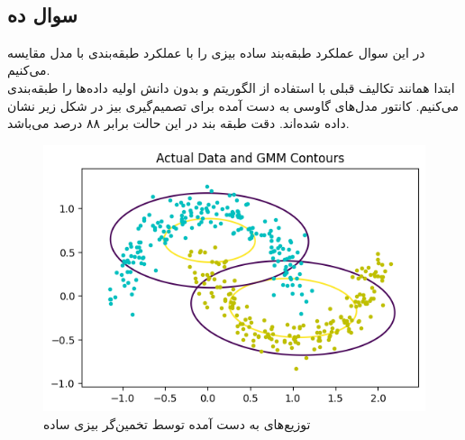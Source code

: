 \documentclass[12pt,onecolumn,a4paper]{article}
\begin{document}
\newpage
~\newpage
\subsection{سوال ده}
در این سوال عملکرد طبقه‌بند ساده بیزی را با عملکرد طبقه‌بندی با مدل  مقایسه می‌کنیم.
\\
ابتدا همانند تکالیف قبلی با استفاده از الگوریتم  و بدون دانش اولیه  داده‌ها را طبقه‌بندی می‌کنیم. کانتور مدل‌های گاوسی به دست آمده برای تصمیم‌گیری بیز در شکل زیر نشان داده شده‌اند. دقت طبقه بند در این حالت برابر ۸۸ درصد می‌باشد.

\begin{figure}[h!]
    \label{fig:4}
    \begin{center}
    \includegraphics[scale=0.6]{q10_bayes.png}
    \caption{توزیع‌های به دست آمده توسط تخمین‌گر بیزی ساده}
    \end{center}
\end{figure}
\end{document}
